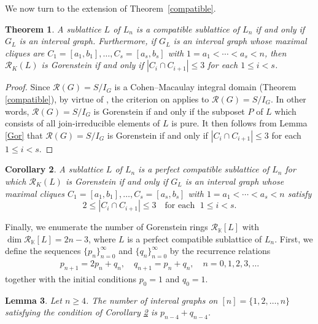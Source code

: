 \documentclass[12pt,a4paper]{amsart}
\def\Rc{{\mathcal R}}
\newtheorem{Theorem}{Theorem}[section]
\newtheorem{Lemma}[Theorem]{Lemma}
\newtheorem{Corollary}[Theorem]{Corollary}
\theoremstyle{definition}
\begin{document}
We now turn to the extension of Theorem~\ref{compatible}.

\begin{Theorem}
    \label{Th_Gorenstein}
A sublattice $L$ of $L_n$ is a compatible sublattice of $L_n$ if and only if $G_L$ is an interval graph.  Furthermore, if $G_L$ is an interval graph whose maximal cliques are $C_1 =[a_1, b_1], \ldots, C_s=[a_s, b_s]$ with $1=a_1 < \cdots < a_s < n$, then $\Rc_K(L)$ is Gorenstein if and only if $|C_i \cap C_{i+1}| \leq 3$ for each $1 \leq i < s$. 
\end{Theorem}

\begin{proof}
Since $\mathcal{R}(G)=S/I_G$ is a Cohen--Macaulay integral domain (Theorem \ref{compatible}), by virtue of \cite[Theorem 4.4]{Stanley78}, the criterion on \cite[p.~107]{Hibi87} applies to $\mathcal{R}(G)=S/I_G$.  In other words, $\mathcal{R}(G)=S/I_G$ is Gorenstein if and only if the subposet $P$ of $L$ which consists of all join-irreducible elements of $L$ is pure.  It then follows from Lemma \ref{Gor} that $\mathcal{R}(G)=S/I_G$ is Gorenstein if and only if $|C_i \cap C_{i+1}| \leq 3$ for each $1 \leq i < s$. 
\end{proof}

\begin{Corollary}
    \label{Cor_Gorenstein}
A sublattice $L$ of $L_n$ is a perfect compatible sublattice of $L_n$ for which $\Rc_K(L)$ is Gorenstein if and only if $G_L$ is an interval graph whose maximal cliques $C_1 =[a_1, b_1], \ldots, C_s=[a_s, b_s]$ with $1=a_1 < \cdots < a_s < n$ satisfy 
$$2 \leq |C_i \cap C_{i+1}| \leq 3 \quad \text{for each } \; 1 \leq i < s.$$ 
\end{Corollary}

Finally, we enumerate the number of Gorenstein rings
$\mathcal{R}_{\mathbb{K}}[L]$ with
$\dim \mathcal{R}_{\mathbb{K}}[L] = 2n - 3$, where $L$ is a perfect
compatible sublattice of $L_n$.
First, we define the sequences $\{p_n\}_{n=0}^\infty$ and
$\{q_n\}_{n=0}^\infty$ by the recurrence relations
\begin{eqnarray}
\label{recurrence}
p_{n+1} = 2p_n + q_n, \quad
q_{n+1} = p_n + q_n, \quad n = 0,1,2,3,\ldots
\end{eqnarray}
together with the initial conditions $p_0 = 1$ and $q_0 = 1$.

\begin{Lemma}
  \label{enumeration}
  Let $n \geq 4$.  The number of interval graphs on $[n] = \{1,2,\dots,n\}$ satisfying the condition of Corollary \ref{Cor_Gorenstein} is $p_{n-4}+q_{n-4}$.
\end{Lemma}
\end{document}

